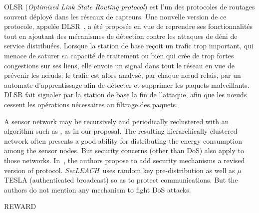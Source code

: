 OLSR (\textit{Optimized Link State Routing protocol}) est l'un des protocoles de routages souvent déployé dans les réseaux de capteurs.
Une nouvelle version de ce protocole, appelée DLSR~\cite{MKASF10}, a été proposée en vue de reprendre ses fonctionnalités tout en ajoutant des mécanismes de détection contre les attaques de déni de service distribuées.
Lorsque la station de base reçoit un trafic trop important, qui menace de saturer sa capacité de traitement ou bien qui crée de trop fortes congestions sur ses liens, elle envoie un signal dans tout le réseau en vue de prévenir les nœuds; le trafic est alors analysé, par chaque nœud relais, par un automate d'apprentissage afin de détecter et supprimer les paquets malveillants.
DLSR fait signaler par la station de base la fin de l'attaque, afin que les nœuds cessent les opérations nécessaires au filtrage des paquets.

A sensor network may be recursively and periodically reclustered with an algorithm such as \leach, as in our proposal.
The resulting hierarchically clustered network often presents a good ability for distributing the energy consumption among the sensor nodes.
But security concerns (other than DoS) also apply to those networks.
In~\cite{OFVWBDL07}, the authors propose to add security mechanisms \via a revised version of \leach protocol.
\textit{SecLEACH}\ uses random key pre-distribution as well as $\mu$TESLA (authenticated broadcast) so as to protect communications.
But the authors do not mention any mechanism to fight DoS attacks.

REWARD


